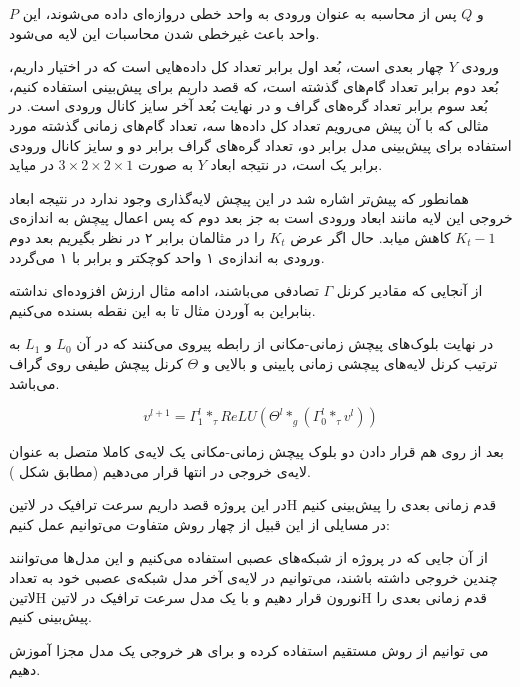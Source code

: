  $P$ و $Q$ پس از محاسبه به عنوان ورودی به واحد خطی دروازه‌ای داده می‌شوند، این واحد باعث غیرخطی شدن محاسبات این لایه می‌شود.

ورودی $Y$ چهار بعدی است، بُعد اول برابر تعداد کل داده‌هایی است که در اختیار داریم، بُعد دوم برابر
تعداد گام‌های گذشته است، که قصد داریم برای پیش‌بینی استفاده کنیم،
بُعد سوم برابر تعداد گره‌های گراف و در نهایت بُعد آخر سایز کانال ورودی است.
در مثالی که با آن پیش می‌رویم تعداد کل داده‌ها سه، تعداد گام‌های زمانی گذشته مورد استفاده برای پیش‌بینی مدل برابر دو،
تعداد گره‌های گراف برابر دو و سایز کانال ورودی برابر یک است، در نتیجه ابعاد $Y$ به صورت $ 3 \times 2 \times 2 \times 1 $ در میاید.

همانطور که پیش‌تر اشاره شد در این پیچش لایه‌گذاری وجود ندارد در نتیجه ابعاد خروجی این لایه مانند ابعاد ورودی است به جز بعد دوم
که پس اعمال پیچش به اندازه‌ی $K_{t}-1$ کاهش میابد. حال اگر عرض $K_{t}$ را در مثالمان برابر ۲ در نظر بگیریم
بعد دوم ورودی به اندازه‌ی ۱ واحد کوچکتر و برابر با ۱ می‌گردد.

از آنجایی که مقادیر کرنل $\Gamma$ تصادفی می‌باشند، ادامه مثال ارزش افزوده‌ای نداشته بنابراین به آوردن مثال تا به این نقطه بسنده می‌کنیم.

در نهایت بلوک‌های پیچش زمانی-مکانی از رابطه  پیروی می‌کنند که در آن $L_{0}$ و $L_{1}$ به ترتیب کرنل‌ لایه‌های پیچشی زمانی پایینی و بالایی و $\Theta$ کرنل پیچش طیفی روی گراف می‌باشد.

\begin{equation}
v^{{l+1}} = \Gamma^{l}_{1} *_{\tau} ReLU( \Theta^{l} *_{g} (\Gamma_{0}^{l} *_{\tau} v^{l}) )
  \label{eq:blocks}
\end{equation}

بعد از روی هم قرار دادن دو بلوک پیچش زمانی-مکانی یک لایه‌ی کاملا متصل به عنوان لایه‌ی خروجی در انتها قرار می‌دهیم (مطابق شکل ).

در این پروژه قصد داریم سرعت ترافیک در ‌لاتین{H} قدم زمانی بعدی را پیش‌بینی کنیم در مسایلی از این قبیل از چهار روش متفاوت می‌توانیم عمل کنیم:


 از آن جایی که در پروژه از شبکه‌های عصبی استفاده می‌کنیم و این مدل‌ها می‌توانند چندین خروجی داشته باشند، می‌توانیم در لایه‌ی آخر مدل شبکه‌ی عصبی خود به تعداد ‌لاتین{H} نورون قرار دهیم و با یک مدل سرعت ترافیک در ‌لاتین{H} قدم زمانی بعدی را پیش‌بینی کنیم.

 می توانیم از روش مستقیم  استفاده کرده و برای هر خروجی یک مدل مجزا آموزش دهیم.

